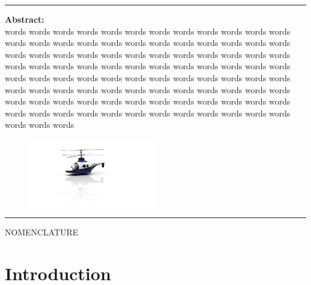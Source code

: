 \documentclass[11pt,a4paper]{article}
\begin{document}
\begin{titlepage}
\hrule
\vspace{10mm}


\textbf{Abstract:}
\\
words words words words words words words words words words words words words words words words words words  words words words words words words words words words  words words words words words words words words words  words words words words words words words words words  words words words words words words words words words  words words words words words words words words words  words words words words words words words words words  words words words words words words words words words  words words words words words words words words words  words words words words words words words words words   

\begin{figure}[H]
    \centering
        \includegraphics[width=0.5\textwidth]{High_res_2.png}
        \end{figure}
\hrule


\vfill
\end{titlepage}
\newpage
\tableofcontents
\thispagestyle{empty}
\newpage
\listoftables
\thispagestyle{empty}
\listoffigures
\thispagestyle{empty}
\newpage
NOMENCLATURE
\thispagestyle{empty}
\newpage
\setcounter{page}{1}


\section{Introduction}
\end{document}
